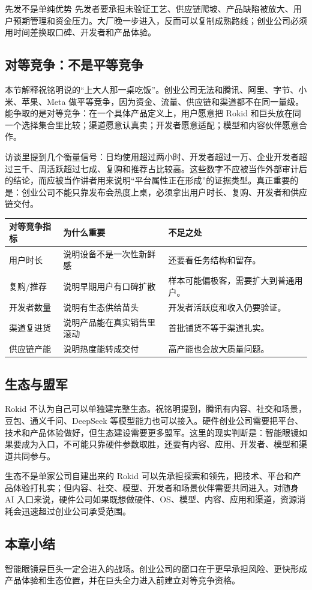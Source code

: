 \begin{warningbox}{先发不是单纯优势}
先发者要承担未验证工艺、供应链爬坡、产品缺陷被放大、用户预期管理和资金压力。大厂晚一步进入，反而可以复制成熟路线；创业公司必须用时间差换取口碑、开发者和产品体验。
\end{warningbox}

\subsection{对等竞争：不是平等竞争}

本节解释祝铭明说的“上大人那一桌吃饭”。创业公司无法和腾讯、阿里、字节、小米、苹果、Meta 做平等竞争，因为资金、流量、供应链和渠道都不在同一量级。能争取的是对等竞争：在一个具体产品定义上，用户愿意把 Rokid 和巨头放在同一个选择集合里比较；渠道愿意认真卖；开发者愿意适配；模型和内容伙伴愿意合作。

访谈里提到几个衡量信号：日均使用超过两小时、开发者超过一万、企业开发者超过三千、周活跃超过七成、复购和推荐占比较高。这些数字不应被当作外部审计后的结论，而应被当作讲者用来说明“平台属性正在形成”的证据类型。真正重要的是：创业公司不能只靠发布会热度上桌，必须拿出用户时长、复购、开发者和供应链交付。

\noindent\begin{tabularx}{\textwidth}{p{}p{}X}
\toprule
对等竞争指标 & 为什么重要 & 不足之处 \\
\midrule
用户时长 & 说明设备不是一次性新鲜感 & 还要看任务结构和留存。 \\
复购/推荐 & 说明早期用户有口碑扩散 & 样本可能偏极客，需要扩大到普通用户。 \\
开发者数量 & 说明有生态供给苗头 & 开发者活跃度和收入仍要验证。 \\
渠道复进货 & 说明产品能在真实销售里滚动 & 首批铺货不等于渠道扎实。 \\
供应链产能 & 说明热度能转成交付 & 高产能也会放大质量问题。 \\
\bottomrule
\end{tabularx}

\subsection{生态与盟军}

Rokid 不认为自己可以单独建完整生态。祝铭明提到，腾讯有内容、社交和场景，豆包、通义千问、DeepSeek 等模型能力也可以接入。硬件创业公司需要把平台、技术和产品体验做好，但生态建设需要更多盟军。这里的现实判断是：智能眼镜如果要成为入口，不可能只靠硬件参数取胜，还要有内容、应用、开发者、模型和渠道共同参与。

\begin{importantbox}{生态不是单家公司自建出来的}
Rokid 可以先承担探索和领先，把技术、平台和产品体验打扎实；但内容、社交、模型、开发者和场景伙伴需要共同进入。对随身 AI 入口来说，硬件公司如果既想做硬件、OS、模型、内容、应用和渠道，资源消耗会迅速超过创业公司承受范围。
\end{importantbox}

\subsection{本章小结}

智能眼镜是巨头一定会进入的战场。创业公司的窗口在于更早承担风险、更快形成产品体验和生态位置，并在巨头全力进入前建立对等竞争资格。

